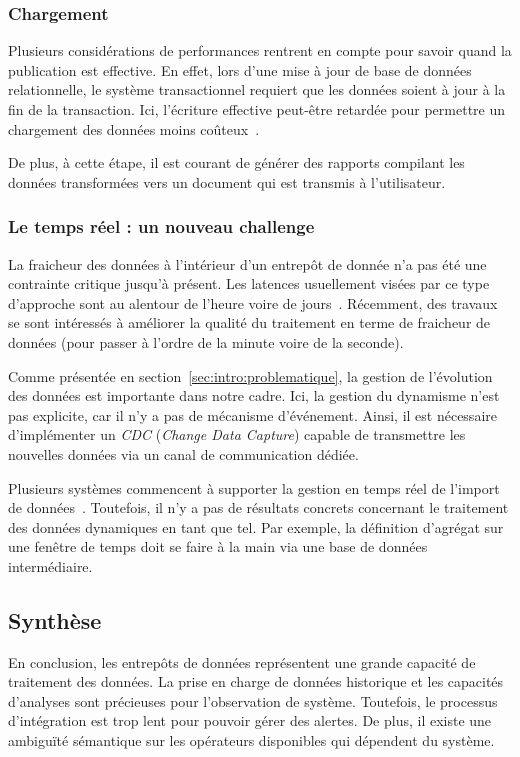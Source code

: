 \subsubsection{Chargement}
Plusieurs considérations de performances rentrent en compte pour savoir quand la publication est effective. En effet, lors d'une mise à jour de base de données relationnelle, le système transactionnel requiert que les données soient à jour à la fin de la transaction. Ici, l'écriture effective peut-être retardée pour permettre un chargement des données moins coûteux~\cite{Petit:historical}.

De plus, à cette étape, il est courant de générer des rapports compilant les données transformées vers un document qui est transmis à l'utilisateur.

\subsubsection{Le temps réel : un nouveau challenge}
La fraicheur des données à l'intérieur d'un entrepôt de donnée n'a pas été une contrainte critique jusqu'à présent. Les latences usuellement visées par ce type d'approche sont au alentour de l'heure voire de jours~\cite{Oracle:realtimedw}. Récemment, des travaux se sont intéressés à améliorer la qualité du traitement en terme de fraicheur de données (pour passer à l'ordre de la minute voire de la seconde).

Comme présentée en section~\ref{sec:intro:problematique}, la gestion de l'évolution des données est importante dans notre cadre. Ici, la gestion du dynamisme n'est pas explicite, car il n'y a pas de mécanisme d'événement. Ainsi, il est nécessaire d'implémenter un \textit{CDC} (\textit{Change Data Capture}) capable de transmettre les nouvelles données via un canal de communication dédiée.

Plusieurs systèmes commencent à supporter la gestion en temps réel de l'import de données~\cite{Thomsen:rite, Oracle:ODI}. Toutefois, il n'y a pas de résultats concrets concernant le traitement des données dynamiques en tant que tel. Par exemple, la définition d'agrégat sur une fenêtre de temps doit se faire à la main via une base de données intermédiaire.

\subsection{Synthèse}
En conclusion, les entrepôts de données représentent une grande capacité de traitement des données. La prise en charge de données historique et les capacités d'analyses sont précieuses pour l'observation de système. Toutefois, le processus d'intégration est trop lent pour pouvoir gérer des alertes. De plus, il existe une ambiguïté sémantique sur les opérateurs disponibles qui dépendent du système.


